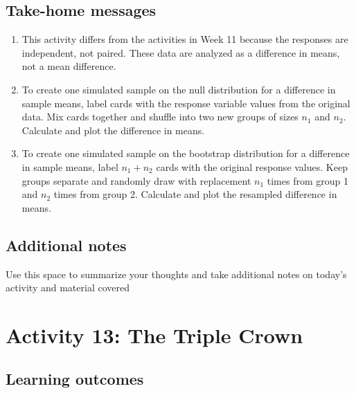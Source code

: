 \documentclass[
]{report}
\begin{document}
\vspace{1in}

\hypertarget{take-home-messages-20}{%
\subsection{Take-home messages}\label{take-home-messages-20}}

\begin{enumerate}
\def\labelenumi{\arabic{enumi}.}
\item
  This activity differs from the activities in Week 11 because the responses are independent, not paired. These data are analyzed as a difference in means, not a mean difference.
\item
  To create one simulated sample on the null distribution for a difference in sample means, label cards with the response variable values from the original data. Mix cards together and shuffle into two new groups of sizes \(n_1\) and \(n_2\). Calculate and plot the difference in means.
\item
  To create one simulated sample on the bootstrap distribution for a difference in sample means, label \(n_1 + n_2\) cards with the original response values. Keep groups separate and randomly draw with replacement \(n_1\) times from group 1 and \(n_2\) times from group 2. Calculate and plot the resampled difference in means.
\end{enumerate}

\hypertarget{additional-notes-20}{%
\subsection{Additional notes}\label{additional-notes-20}}

Use this space to summarize your thoughts and take additional notes on today's activity and material covered

\newpage

\hypertarget{activity-13-the-triple-crown}{%
\section{Activity 13: The Triple Crown}\label{activity-13-the-triple-crown}}


\hypertarget{learning-outcomes-26}{%
\subsection{Learning outcomes}\label{learning-outcomes-26}}
\end{document}
